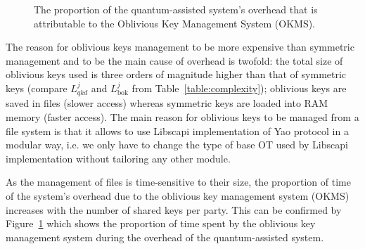 



\begin{figure}
    \centering
    \caption{The proportion of the quantum-assisted system's overhead that is attributable to the Oblivious Key Management System (OKMS).}
    \label{fig:overhead}
\end{figure}

The reason for oblivious keys management to be more expensive than symmetric management and to be the main cause of overhead is twofold: the total size of oblivious keys used is three orders of magnitude higher than that of symmetric keys (compare $L^j_{qkd}$ and $L^j_{\text{bok}}$ from Table~\ref{table:complexity}); oblivious keys are saved in files (slower access) whereas symmetric keys are loaded into RAM memory (faster access). The main reason for oblivious keys to be managed from a file system is that it allows to use Libscapi implementation of Yao protocol in a modular way, i.e. we only have to change the type of base OT used by Libscapi implementation without tailoring any other module.

As the management of files is time-sensitive to their size, the proportion of time of the system's overhead due to the oblivious key management system (OKMS) increases with the number of shared keys per party. This can be confirmed by Figure~\ref{fig:overhead} which shows the proportion of time spent by the oblivious key management system during the overhead of the quantum-assisted system.

